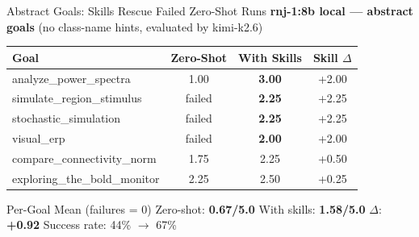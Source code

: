 \documentclass[aspectratio=169,10pt]{beamer}
\begin{document}
\begin{frame}{Abstract Goals: Skills Rescue Failed Zero-Shot Runs}
  \centering
  \small
  \textbf{rnj-1:8b local — abstract goals} (no class-name hints, evaluated by kimi-k2.6)
  
  \vspace{0.3cm}
  \renewcommand{\arraystretch}{1.25}
  \begin{tabular}{l c c c}
    \toprule
    \textbf{Goal} & \textbf{Zero-Shot} & \textbf{With Skills} & \textbf{Skill $\Delta$} \\
    \midrule
    analyze\_power\_spectra & 1.00 & \textbf{3.00} & +2.00 \\
    simulate\_region\_stimulus & failed & \textbf{2.25} & +2.25 \\
    stochastic\_simulation & failed & \textbf{2.25} & +2.25 \\
    visual\_erp & failed & \textbf{2.00} & +2.00 \\
    compare\_connectivity\_norm & 1.75 & 2.25 & +0.50 \\
    exploring\_the\_bold\_monitor & 2.25 & 2.50 & +0.25 \\
    \bottomrule
  \end{tabular}
  
  \vspace{0.3cm}
  \begin{block}{Per-Goal Mean (failures = 0)}
    Zero-shot: \textbf{0.67/5.0} \quad
    With skills: \textbf{1.58/5.0} \quad
    $\Delta$: \textbf{+0.92} \quad
    Success rate: 44\% $\to$ 67\%
  \end{block}
\end{frame}
\end{document}
